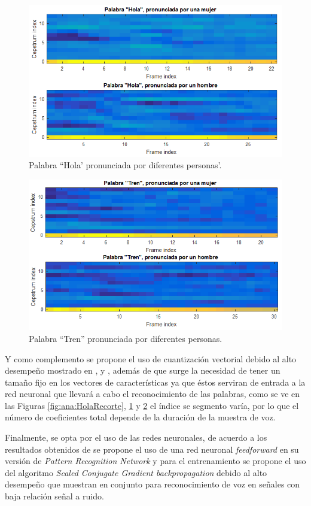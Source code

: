 	 \begin{figure}[H]
			\centering
			\includegraphics[width=0.8\linewidth]{figures/mfccHola}
			\caption{Palabra ``Hola' pronunciada por diferentes personas'.}
			\label{fig:ana:mfccHola}
	\end{figure}
	
	 \begin{figure}[H]
			\centering
			\includegraphics[width=0.8\linewidth]{figures/mfccTren}
			\caption{Palabra ``Tren'' pronunciada por diferentes personas.}
			\label{fig:ana:mfccTren}
	\end{figure}
	
	Y como complemento se propone el uso de cuantización vectorial debido al alto desempeño mostrado en \cite{A6}, \cite{A7} y \cite{A8}, además de que surge la necesidad de tener un tamaño fijo en los vectores de características ya que éstos serviran de entrada a la red neuronal que llevará a cabo el reconocimiento de las palabras, como se ve en las Figuras \ref{fig:ana:HolaRecorte}, \ref{fig:ana:mfccHola} y \ref{fig:ana:mfccTren} el índice se segmento varía, por lo que el número de coeficientes total depende de la duración de la muestra de voz.
	
	Finalmente, se opta por el uso de las redes neuronales, de acuerdo a los resultados obtenidos de \cite{A3} se propone el uso de una red neuronal \textit{feedforward} en su versión de \textit{Pattern Recognition Network} y para el entrenamiento se propone el uso del algoritmo \textit{Scaled Conjugate Gradient backpropagation} debido al alto desempeño que muestran en conjunto para reconocimiento de voz en señales con baja relación señal a ruido.

